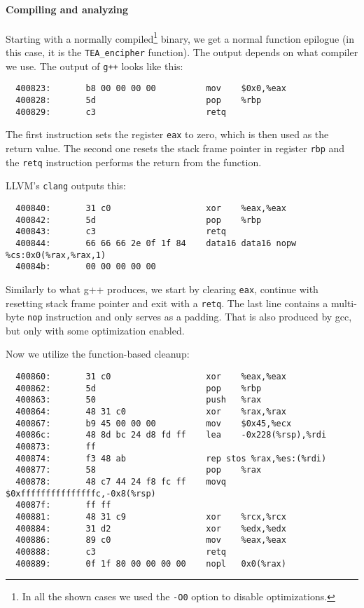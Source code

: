 \documentclass[a4paper,10pt,openright]{memoir}
\newcommand{\code}[1]{\texttt{#1}}
\begin{document}
\paragraph{Compiling and analyzing}

Starting with a normally compiled\footnote{In all the shown cases we 
used the \code{-O0} option to disable optimizations.} binary, we get a 
normal function epilogue (in this case, it is the \code{TEA\_encipher} 
function). The output depends on what compiler we use. The output of 
\code{g++} looks like this:


\begin{verbatim}
  400823:       b8 00 00 00 00          mov    $0x0,%eax
  400828:       5d                      pop    %rbp
  400829:       c3                      retq
\end{verbatim}

The first instruction sets the register \code{eax} to zero, which is 
then used as the return value. The second one resets the stack frame 
pointer in register \code{rbp} and the \code{retq} instruction performs 
the return from the function.

LLVM's \code{clang} outputs this:

\begin{verbatim}
  400840:       31 c0                   xor    %eax,%eax
  400842:       5d                      pop    %rbp
  400843:       c3                      retq   
  400844:       66 66 66 2e 0f 1f 84    data16 data16 nopw %cs:0x0(%rax,%rax,1)
  40084b:       00 00 00 00 00 
\end{verbatim}

Similarly to what g++ produces, we start by clearing \code{eax}, 
continue with resetting stack frame pointer and exit with a 
\code{retq}. The last line contains a multi-byte \code{nop} instruction 
and only serves as a padding. That is also produced by gcc, but only 
with some optimization enabled.


Now we utilize the function-based cleanup:

\begin{verbatim}
  400860:       31 c0                   xor    %eax,%eax
  400862:       5d                      pop    %rbp
  400863:       50                      push   %rax
  400864:       48 31 c0                xor    %rax,%rax
  400867:       b9 45 00 00 00          mov    $0x45,%ecx
  40086c:       48 8d bc 24 d8 fd ff    lea    -0x228(%rsp),%rdi
  400873:       ff 
  400874:       f3 48 ab                rep stos %rax,%es:(%rdi)
  400877:       58                      pop    %rax
  400878:       48 c7 44 24 f8 fc ff    movq   $0xfffffffffffffffc,-0x8(%rsp)
  40087f:       ff ff 
  400881:       48 31 c9                xor    %rcx,%rcx
  400884:       31 d2                   xor    %edx,%edx
  400886:       89 c0                   mov    %eax,%eax
  400888:       c3                      retq   
  400889:       0f 1f 80 00 00 00 00    nopl   0x0(%rax)
\end{verbatim}
\end{document}
